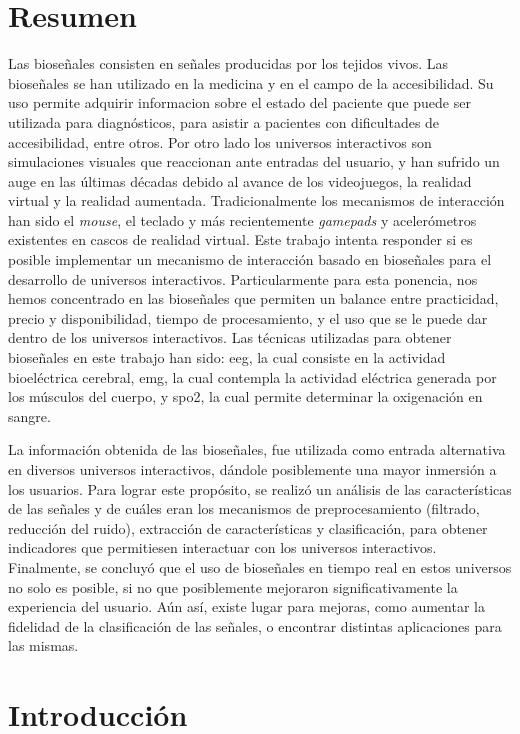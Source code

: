 \documentclass[a4paper]{report}
\begin{document}
\chapter*{Resumen}
Las bioseñales consisten en señales producidas por los tejidos vivos. Las bioseñales se han utilizado en la medicina y en el campo de la accesibilidad. Su uso permite adquirir informacion sobre el estado del paciente que puede ser utilizada para diagnósticos, para asistir a pacientes con dificultades de accesibilidad, entre otros. Por otro lado los universos interactivos son simulaciones visuales que reaccionan ante entradas del usuario, y han sufrido un auge en las últimas décadas debido al avance de los videojuegos, la realidad virtual y la realidad aumentada.  Tradicionalmente los mecanismos de interacción han sido el \emph{mouse}, el teclado y más recientemente \emph{gamepads} y acelerómetros existentes en cascos de realidad virtual.  Este trabajo intenta responder si es posible implementar un mecanismo de interacción basado en bioseñales para el desarrollo de universos interactivos.  Particularmente para esta ponencia, nos hemos concentrado en las bioseñales que permiten un balance entre practicidad, precio y disponibilidad, tiempo de procesamiento, y el uso que se le puede dar dentro de los universos interactivos. Las técnicas utilizadas para obtener bioseñales en este trabajo han sido: \gls{eeg}, la cual consiste en la actividad bioeléctrica cerebral, \gls{emg}, la cual contempla la actividad eléctrica generada por los músculos del cuerpo, y \gls{spo2}, la cual permite determinar la oxigenación en sangre.

La información obtenida de las bioseñales, fue utilizada como entrada alternativa en diversos universos interactivos, dándole posiblemente una mayor inmersión a los usuarios. Para lograr este propósito, se realizó un análisis de las características de las señales y de cuáles eran los mecanismos de preprocesamiento (filtrado, reducción del ruido), extracción de características y clasificación, para obtener indicadores que permitiesen interactuar con los universos interactivos.  Finalmente, se concluyó que el uso de bioseñales en tiempo real en estos universos no solo es posible, si no que posiblemente mejoraron significativamente la experiencia del usuario. Aún así, existe lugar para mejoras, como aumentar la fidelidad de la clasificación de las señales, o encontrar distintas aplicaciones para las mismas.


\tableofcontents

\chapter{Introducción}

\end{document}
